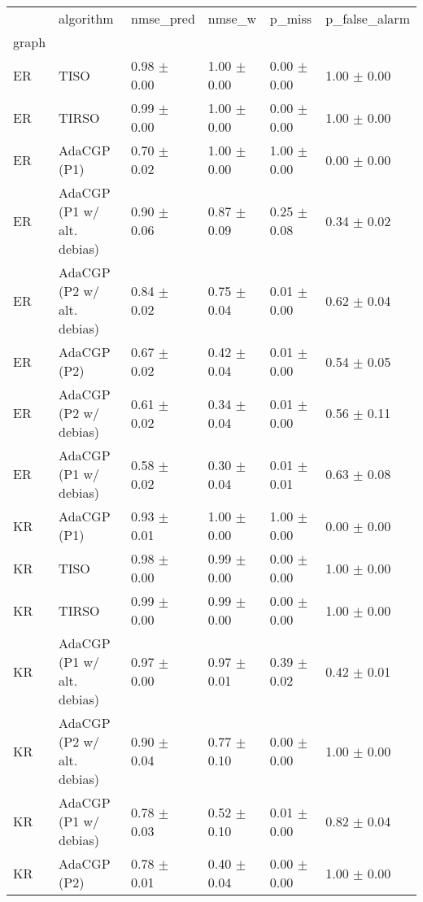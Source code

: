 \begin{tabular}{llllll}
\toprule
{} &                   algorithm &        nmse_pred &           nmse_w &           p_miss &    p_false_alarm \\
graph  &                             &                  &                  &                  &                  \\
\midrule
ER     &                        TISO &  0.98 $\pm$ 0.00 &  1.00 $\pm$ 0.00 &  0.00 $\pm$ 0.00 &  1.00 $\pm$ 0.00 \\
ER     &                       TIRSO &  0.99 $\pm$ 0.00 &  1.00 $\pm$ 0.00 &  0.00 $\pm$ 0.00 &  1.00 $\pm$ 0.00 \\
ER     &                 AdaCGP (P1) &  0.70 $\pm$ 0.02 &  1.00 $\pm$ 0.00 &  1.00 $\pm$ 0.00 &  0.00 $\pm$ 0.00 \\
ER     &  AdaCGP (P1 w/ alt. debias) &  0.90 $\pm$ 0.06 &  0.87 $\pm$ 0.09 &  0.25 $\pm$ 0.08 &  0.34 $\pm$ 0.02 \\
ER     &  AdaCGP (P2 w/ alt. debias) &  0.84 $\pm$ 0.02 &  0.75 $\pm$ 0.04 &  0.01 $\pm$ 0.00 &  0.62 $\pm$ 0.04 \\
ER     &                 AdaCGP (P2) &  0.67 $\pm$ 0.02 &  0.42 $\pm$ 0.04 &  0.01 $\pm$ 0.00 &  0.54 $\pm$ 0.05 \\
ER     &       AdaCGP (P2 w/ debias) &  0.61 $\pm$ 0.02 &  0.34 $\pm$ 0.04 &  0.01 $\pm$ 0.00 &  0.56 $\pm$ 0.11 \\
ER     &       AdaCGP (P1 w/ debias) &  0.58 $\pm$ 0.02 &  0.30 $\pm$ 0.04 &  0.01 $\pm$ 0.01 &  0.63 $\pm$ 0.08 \\
KR     &                 AdaCGP (P1) &  0.93 $\pm$ 0.01 &  1.00 $\pm$ 0.00 &  1.00 $\pm$ 0.00 &  0.00 $\pm$ 0.00 \\
KR     &                        TISO &  0.98 $\pm$ 0.00 &  0.99 $\pm$ 0.00 &  0.00 $\pm$ 0.00 &  1.00 $\pm$ 0.00 \\
KR     &                       TIRSO &  0.99 $\pm$ 0.00 &  0.99 $\pm$ 0.00 &  0.00 $\pm$ 0.00 &  1.00 $\pm$ 0.00 \\
KR     &  AdaCGP (P1 w/ alt. debias) &  0.97 $\pm$ 0.00 &  0.97 $\pm$ 0.01 &  0.39 $\pm$ 0.02 &  0.42 $\pm$ 0.01 \\
KR     &  AdaCGP (P2 w/ alt. debias) &  0.90 $\pm$ 0.04 &  0.77 $\pm$ 0.10 &  0.00 $\pm$ 0.00 &  1.00 $\pm$ 0.00 \\
KR     &       AdaCGP (P1 w/ debias) &  0.78 $\pm$ 0.03 &  0.52 $\pm$ 0.10 &  0.01 $\pm$ 0.00 &  0.82 $\pm$ 0.04 \\
KR     &                 AdaCGP (P2) &  0.78 $\pm$ 0.01 &  0.40 $\pm$ 0.04 &  0.00 $\pm$ 0.00 &  1.00 $\pm$ 0.00 \\

\end{tabular}
